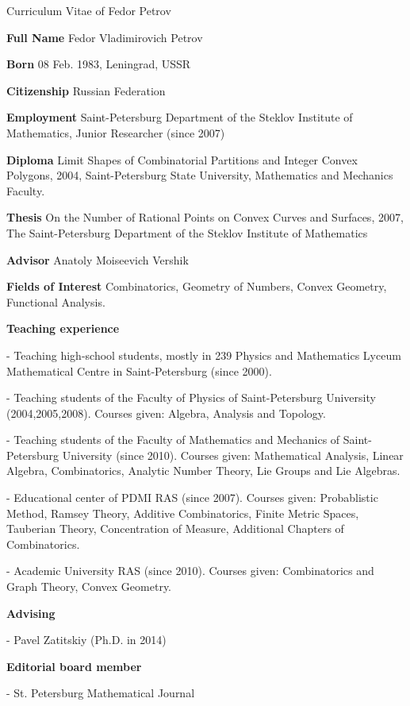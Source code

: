 \documentclass[12pt,russian]{article}
\begin{document}
\begin{center}
Curriculum Vitae of Fedor Petrov
\end{center}

\textbf{Full Name} Fedor Vladimirovich Petrov

\textbf{Born} 08 Feb. 1983, Leningrad, USSR

\textbf{Citizenship} Russian Federation

\textbf{Employment} Saint-Petersburg Department of the Steklov Institute of Mathematics,
Junior Researcher (since 2007)

\textbf{Diploma} Limit Shapes of Combinatorial Partitions
and Integer Convex Polygons, 2004, Saint-Petersburg State University,
Mathematics and Mechanics Faculty.

\textbf{Thesis} On the Number of Rational Points on Convex Curves and Surfaces, 2007,
The Saint-Petersburg Department of the Steklov Institute of Mathematics

\textbf{Advisor} Anatoly Moiseevich Vershik

\textbf{Fields of Interest} Combinatorics, Geometry of Numbers, Convex Geometry,
Functional Analysis.

\textbf{Teaching experience}

- Teaching high-school students, mostly in 239 Physics
and Mathematics Lyceum Mathematical
Centre in Saint-Petersburg (since 2000).


- Teaching students of the Faculty of Physics of Saint-Petersburg
University (2004,2005,2008). Courses given: Algebra, Analysis
and Topology.

- Teaching students
of the Faculty of Mathematics and Mechanics
of Saint-Petersburg University (since 2010).
Courses given: Mathematical Analysis, Linear Algebra,
Combinatorics, Analytic Number Theory, Lie Groups
and Lie Algebras.

- Educational center of PDMI RAS (since 2007).
Courses given: Probablistic Method, Ramsey Theory,
Additive Combinatorics, Finite Metric Spaces,
Tauberian Theory, Concentration of Measure,
Additional Chapters of Combinatorics.

- Academic University RAS (since 2010).
Courses given: Combinatorics and Graph Theory, Convex Geometry. 

\textbf{Advising}

- Pavel Zatitskiy (Ph.D. in 2014)

\textbf{Editorial board member}

- St. Petersburg Mathematical Journal
\end{document}
